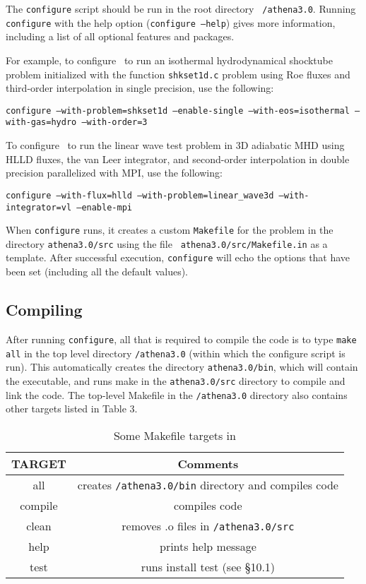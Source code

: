 The {\tt configure} script should be run in the root directory {\tt
/athena3.0}.  Running {\tt configure} with the help option ({\tt configure
--help}) gives more information, including a list of all optional features
and packages.

For example, to configure \ath\ to run an isothermal hydrodynamical shocktube
problem initialized with the function {\tt shkset1d.c} problem
using Roe fluxes and third-order interpolation in single precision, use the
following:
\begin{center}
{\tt configure --with-problem=shkset1d --enable-single --with-eos=isothermal --with-gas=hydro --with-order=3}
\end{center}

To configure \ath\ to run the linear wave test problem in 3D adiabatic
MHD using HLLD fluxes, the van Leer integrator, and second-order interpolation in double precision
parallelized with MPI, use the following:
\begin{center}
{\tt configure --with-flux=hlld --with-problem=linear\_wave3d --with-integrator=vl --enable-mpi}
\end{center}

When {\tt configure} runs, it creates a custom {\tt Makefile} for the
problem in the directory {\tt athena3.0/src} using the file {\tt
athena3.0/src/Makefile.in} as a template.  After successful execution,
{\tt configure} will echo the options that have been set (including all
the default values).

\subsection{Compiling \ath}

After running {\tt configure}, all that is required to compile the code
is to type {\tt make all} in the top level directory {\tt /athena3.0}
(within which the configure script is run).  This automatically creates
the directory {\tt athena3.0/bin}, which will contain the executable,
and runs make in the {\tt athena3.0/src} directory to compile and link
the code.  The top-level Makefile in the {\tt /athena3.0} directory also
contains other targets listed in Table 3.

\begin{center}
\begin{table}[ht]
\caption{Some Makefile targets in \ath}
\begin{tabular}{|c|c|} \hline \hline
TARGET & Comments \\ \hline
all & creates {\tt /athena3.0/bin} directory and compiles code \\
compile & compiles code \\
clean & removes .o files in {\tt /athena3.0/src} \\
help & prints help message \\
test & runs install test (see \S 10.1) \\
\hline
\end{tabular}
\end{table}
\end{center}

